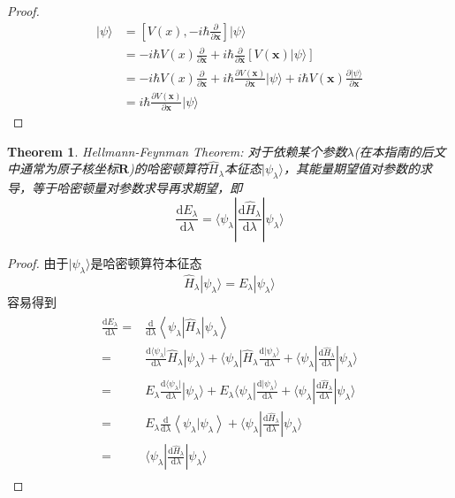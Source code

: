\documentclass{article}
\newtheorem{theorem}{Theorem}[section]
\newtheorem{proof}{Proof}[section]
\numberwithin{equation}{section}
\newcommand{\ket}[1]{| #1 \rangle}
\begin{document}
\begin{proof}
    \begin{align*}
    [V(\textbf{x}),\textbf{p}] \ket{\psi} & = [V(x),-i\hbar \frac{\partial}{\partial \textbf{x}}]\ket{\psi}\\
    & = -i\hbar V(x) \frac{\partial }{\partial \textbf{x}} + i\hbar \frac{\partial}{\partial \textbf{x}}[V(\textbf{x})\ket{\psi}]\\
    &= -i\hbar V(x) \frac{\partial }{\partial \textbf{x}}+ i\hbar \frac{\partial V(\textbf{x})}{\partial \textbf{x}}\ket{\psi} +  i\hbar V(\textbf{x}) \frac{\partial \ket{\psi}}{\partial \textbf{x}}\\
    &= i\hbar \frac{\partial V(\textbf{x})}{\partial \textbf{x}} \ket{\psi}
    \end{align*}
  \end{proof}

  \begin{theorem}
    Hellmann-Feynman Theorem:
    对于依赖某个参数$\lambda$(在本指南的后文中通常为原子核坐标$\mathbf{R}$)的哈密顿算符$\hat{H}_\lambda$本征态$|\psi_\lambda\rangle$，其能量期望值对参数的求导，等于哈密顿量对参数求导再求期望，即
    \begin{equation}
      \frac{\mathrm{d}E_\lambda}{\mathrm{d}\lambda} = \langle\psi_\lambda|\frac{\mathrm{d}\hat{H}_\lambda}{\mathrm{d}\lambda}|\psi_\lambda\rangle
    \end{equation}
  \end{theorem}

  \begin{proof}
    由于$|\psi_\lambda\rangle$是哈密顿算符本征态
    \begin{equation*}
      \hat{H}_\lambda|\psi_\lambda\rangle=E_\lambda|\psi_\lambda\rangle
    \end{equation*}  
    容易得到
    \begin{align*}
      \begin{aligned}
        \frac{\mathrm{d} E_{\lambda}}{\mathrm{d} \lambda}=&\frac{\mathrm{d}}{\mathrm{d} \lambda}\left\langle\psi_{\lambda}\left|\hat{H}_{\lambda}\right| \psi_{\lambda}\right\rangle\\
        =&\frac{\mathrm{d} \langle\psi_\lambda|}{\mathrm{d} \lambda}\hat{H}_\lambda|\psi_\lambda\rangle+\langle\psi_\lambda|\hat{H}_\lambda\frac{\mathrm{d} |\psi_\lambda\rangle}{\mathrm{d} \lambda}+\langle\psi_\lambda|\frac{\mathrm{d}\hat{H}_\lambda}{\mathrm{d}\lambda}|\psi_\lambda\rangle\\
        =&E_\lambda\frac{\mathrm{d} \langle\psi_\lambda|}{\mathrm{d} \lambda}|\psi_\lambda\rangle+E_\lambda\langle\psi_\lambda|\frac{\mathrm{d} |\psi_\lambda\rangle}{\mathrm{d} \lambda}+\langle\psi_\lambda|\frac{\mathrm{d}\hat{H}_\lambda}{\mathrm{d}\lambda}|\psi_\lambda\rangle\\
        =&E_\lambda\frac{\mathrm{d}}{\mathrm{d}\lambda}\left\langle\psi_{\lambda} | \psi_{\lambda}\right\rangle+\langle\psi_\lambda|\frac{\mathrm{d}\hat{H}_\lambda}{\mathrm{d}\lambda}|\psi_\lambda\rangle\\
        =&\langle\psi_\lambda|\frac{\mathrm{d}\hat{H}_\lambda}{\mathrm{d}\lambda}|\psi_\lambda\rangle
      \end{aligned}
    \end{align*}
  \end{proof}
\end{document}
